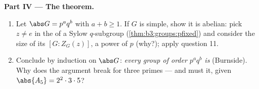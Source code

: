 \begin{problem}
\medskip
\noindent\textbf{Part IV --- The theorem.}
\begin{enumerate}[resume]
  \item Let $\abs G = p^aq^b$ with $a + b \geq 1$. If $G$ is
        simple, show it is abelian: pick $z \neq e$ in the
         of a Sylow $q$-subgroup
        (\cref{thm:b3:groups:pfixed}) and consider the size of
        its  $[G : Z_G(z)]$, a power of $p$
        (why?); apply question 11.
  \item Conclude by induction on $\abs G$: \emph{every group of
        order $p^aq^b$ is } (Burnside). Why does the
        argument break for three primes --- and must it, given
        $\abs{A_5} = 2^2\cdot3\cdot5$?
\end{enumerate}


\end{problem}
